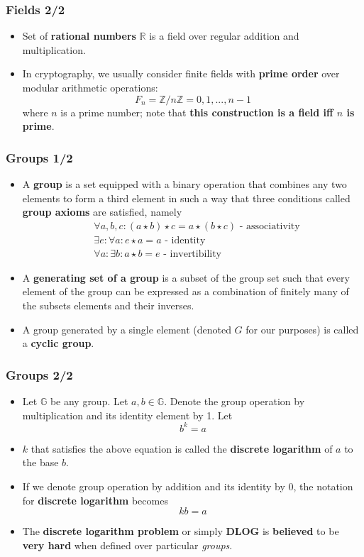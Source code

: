 \documentclass{beamer}
\begin{document}
\begin{frame}
  \frametitle{Fields 2/2}
  \begin{itemize}
  \item Set of \textbf{rational numbers} $\mathbb{R}$ is a field over regular
    addition and multiplication.
  \item In cryptography, we usually consider finite fields with \textbf{prime
      order} over modular arithmetic operations:
    $$F_n = \mathbb{Z}/n\mathbb{Z} = {0, 1, ..., n - 1}$$
    where $n$ is a prime number; note that \textbf{this construction is a field
      iff $n$ is prime}.
  \end{itemize}
\end{frame}

\begin{frame}
  \frametitle{Groups 1/2}
  \begin{itemize}
  \item A \textbf{group} is a set equipped with a binary
    operation that combines any two elements to form a third element in such a
    way that three conditions called \textbf{group axioms} are satisfied, namely
    \begin{align*}
      &\forall a, b, c: (a \star b) \star c = a \star (b \star c) \text{ - associativity} \\
      &\exists e: \forall a: e \star a = a \text{ - identity} \\
      &\forall a: \exists b: a \star b = e \text{ - invertibility}
    \end{align*}
  \item A \textbf{generating set of a group} is a subset of the group set such
    that every element of the group can be expressed as a combination of
    finitely many of the subsets elements and their inverses.
  \item A group generated by a single element (denoted $G$ for our purposes) is
    called a \textbf{cyclic group}.
  \end{itemize}
\end{frame}

\begin{frame}
  \frametitle{Groups 2/2}
  \begin{itemize}
  \item Let $\mathbb{G}$ be any group. Let $a, b \in \mathbb{G}$. Denote the
    group operation by multiplication and its identity element by 1. Let
    $$b^k = a$$
  \item $k$ that satisfies the above equation is called the \textbf{discrete
      logarithm} of $a$ to the base $b$.
  \item If we denote group operation by addition and its identity by 0, the
    notation for \textbf{discrete logarithm} becomes
    $$kb = a$$
  \item The \textbf{discrete logarithm problem} or simply \textbf{DLOG} is
    \textbf{believed} to be \textbf{very hard} when defined over particular
    \textit{groups}.
  \end{itemize}
\end{frame}
\end{document}
